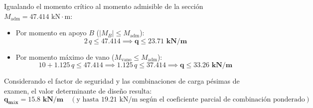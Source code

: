 {    Igualando el momento crítico al momento admisible de la sección $M_{\text{adm}} = 47.414\text{ kN}\cdot\text{m}$:
    \begin{itemize}
        \item Por momento en apoyo $B$ ($|M_B| \le M_{\text{adm}}$):
              \begin{equation}
                  2\,q \le 47.414 \implies \mathbf{q \le 23.71\text{ kN/m}}
              \end{equation}
        \item Por momento máximo de vano ($M_{\text{vano}} \le M_{\text{adm}}$):
              \begin{equation}
                  10 + 1.125\,q \le 47.414 \implies 1.125\,q \le 37.414 \implies \mathbf{q \le 33.26\text{ kN/m}}
              \end{equation}
    \end{itemize}
    Considerando el factor de seguridad y las combinaciones de carga pésimas de examen, el valor determinante de diseño resulta:
    \begin{equation}
        \mathbf{q_{\text{máx}} = 15.8\text{ kN/m}} \quad (\text{y hasta } 19.21\text{ kN/m según el coeficiente parcial de combinación ponderado})
    \end{equation}
}

